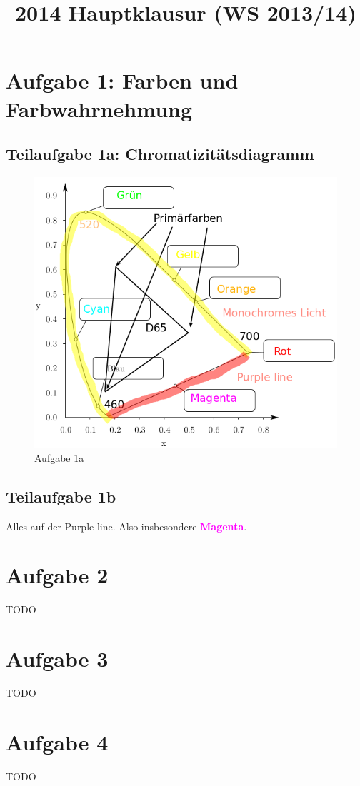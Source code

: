 \documentclass[a4paper]{scrartcl}
\begin{document}
\title{2014 Hauptklausur (WS 2013/14)}

\setcounter{section}{1}
\section*{Aufgabe 1: Farben und Farbwahrnehmung}
\subsection*{Teilaufgabe 1a: Chromatizitätsdiagramm}
\begin{figure}[h]
    \centering
    \includegraphics*[width=0.8\linewidth, keepaspectratio]{1a.png}
    \caption{Aufgabe 1a}
    \label{fig:1a}
\end{figure}

\subsection*{Teilaufgabe 1b}
Alles auf der Purple line. Also insbesondere \textcolor{magenta}{\textbf{Magenta}}.

\section*{Aufgabe 2}
TODO

\section*{Aufgabe 3}
TODO

\section*{Aufgabe 4}
TODO
\end{document}
